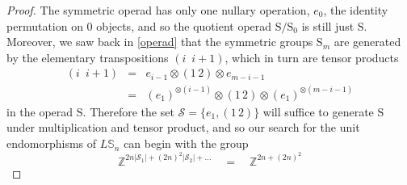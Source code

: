 \documentclass{amsbook} %
\numberwithin{section}{chapter}
\begin{document}
\begin{proof}
The symmetric operad has only one nullary operation, $e_0$, the identity permutation on 0 objects, and so the quotient operad $\mathrm{S}/\mathrm{S}_0$ is still just $\mathrm{S}$. Moreover, we saw back in \cref{operad} that the symmetric groups $\mathrm{S}_m$ are generated by the elementary transpositions $(i \, \, \, i+1)$, which in turn are tensor products
\[ \begin{array}{rll}
			(i \, \, \,  i+1) & = & e_{i-1} \otimes (1 \, 2) \otimes e_{m-i-1} \\
			& = & (e_1)^{\otimes (i-1)} \otimes (1 \, 2) \otimes (e_1)^{\otimes (m-i-1)}
		\end{array}
\]
in the operad $\mathrm{S}$. Therefore the set $\mathcal{S} = \{ e_1, (1 \, 2) \}$ will suffice to generate $\mathrm{S}$ under multiplication and tensor product, and so our search for the unit endomorphisms of $L\mathbb{S}_n$ can begin with the group
\[ \mathbb{Z}^{2n|\mathcal{S}_1| + (2n)^2|\mathcal{S}_2| + ...}  \quad = \quad \mathbb{Z}^{2n + (2n)^2} \]


\end{proof}
\end{document}
